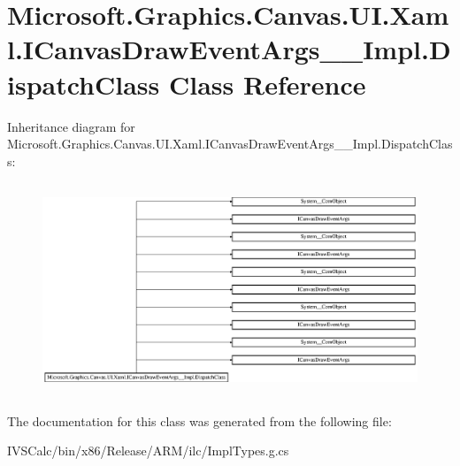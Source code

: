 \hypertarget{class_microsoft_1_1_graphics_1_1_canvas_1_1_u_i_1_1_xaml_1_1_i_canvas_draw_event_args_____impl_1_1_dispatch_class}{}\section{Microsoft.\+Graphics.\+Canvas.\+U\+I.\+Xaml.\+I\+Canvas\+Draw\+Event\+Args\+\_\+\+\_\+\+Impl.\+Dispatch\+Class Class Reference}
\label{class_microsoft_1_1_graphics_1_1_canvas_1_1_u_i_1_1_xaml_1_1_i_canvas_draw_event_args_____impl_1_1_dispatch_class}
Inheritance diagram for Microsoft.\+Graphics.\+Canvas.\+U\+I.\+Xaml.\+I\+Canvas\+Draw\+Event\+Args\+\_\+\+\_\+\+Impl.\+Dispatch\+Class\+:\begin{figure}[H]
\begin{center}
\leavevmode
\includegraphics[height=6.403327cm]{class_microsoft_1_1_graphics_1_1_canvas_1_1_u_i_1_1_xaml_1_1_i_canvas_draw_event_args_____impl_1_1_dispatch_class}
\end{center}
\end{figure}


The documentation for this class was generated from the following file\+:\begin{DoxyCompactItemize}
\item 
I\+V\+S\+Calc/bin/x86/\+Release/\+A\+R\+M/ilc/Impl\+Types.\+g.\+cs\end{DoxyCompactItemize}
